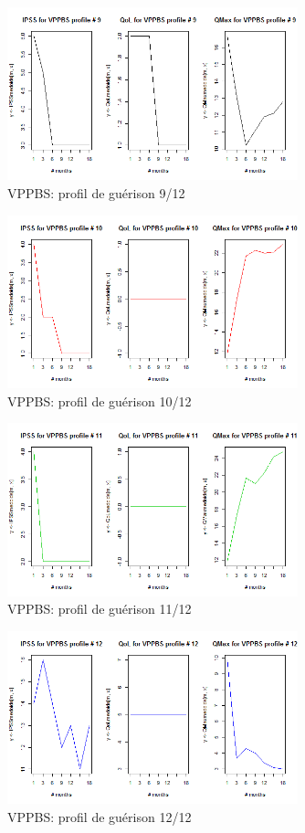 \begin{figure}[H]
\centering
\includegraphics[width=0.75\textwidth]{../Fig/VPPBS/vppbs-profil-post-09.png}
\caption{VPPBS: profil de guérison 9/12}

\end{figure}

\begin{figure}[H]
\centering
\includegraphics[width=0.75\textwidth]{../Fig/VPPBS/vppbs-profil-post-10.png}
\caption{VPPBS: profil de guérison 10/12}
\end{figure}


\begin{figure}[H]
\centering
\includegraphics[width=0.75\textwidth]{../Fig/VPPBS/vppbs-profil-post-11.png}
\caption{VPPBS: profil de guérison 11/12}
\end{figure}

\begin{figure}[H]
\centering
\includegraphics[width=0.75\textwidth]{../Fig/VPPBS/vppbs-profil-post-12.png}
\caption{VPPBS: profil de guérison 12/12}
\end{figure}


%

